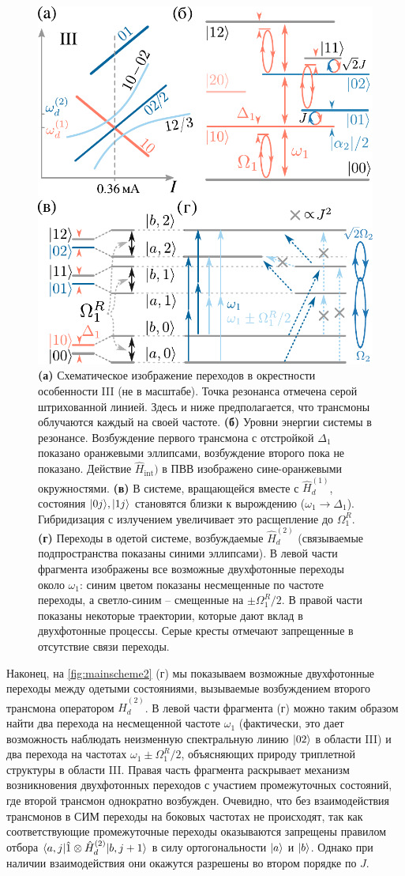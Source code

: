 \documentclass[14pt, a4paper]{extreport}
\DeclarePairedDelimiter\bra{\langle}{\rvert}
\DeclarePairedDelimiter\ket{\lvert}{\rangle}
\numberwithin{equation}{section}
\begin{document}
\begin{figure}
	\centering
	\includegraphics[width=0.6\linewidth]{Pictures/main_scheme_2}
	\caption{\textbf{(а)} Схематическое изображение переходов в окрестности особенности III (не в масштабе). Точка резонанса отмечена серой штрихованной линией. Здесь и ниже предполагается, что трансмоны облучаются каждый на своей частоте. \textbf{(б)} Уровни энергии системы в резонансе. Возбуждение первого трансмона с отстройкой $\Delta_1$ показано оранжевыми эллипсами, возбуждение второго пока не показано. Действие $\hat H_\text{int})$ в ПВВ изображено сине-оранжевыми окружностями. \textbf{(в)} В системе, вращающейся вместе с $\hat H_d^{(1)}$, состояния $\ket{0j},\ket{1j}$ становятся близки к вырождению ($\omega_1 \rightarrow \Delta_1$). Гибридизация с излучением увеличивает это расщепление до $\Omega_1^R$. \textbf{(г)} Переходы в одетой системе, возбуждаемые $\hat H_d^{(2)}$ (связываемые подпространства показаны синими эллипсами). В левой части фрагмента изображены все возможные двухфотонные переходы около $\omega_1$: синим цветом показаны несмещенные по частоте переходы, а светло-синим -- смещенные на $\pm \Omega_1^R/2$. В правой части показаны некоторые траектории, которые дают вклад в двухфотонные процессы. Серые кресты отмечают запрещенные в отсутствие связи переходы.}
	\label{fig:mainscheme2}
\end{figure}


Наконец, на \autoref{fig:mainscheme2} (г) мы показываем возможные двухфотонные переходы между одетыми состояниями, вызываемые возбуждением второго трансмона оператором $\hat H_d^{(2)}$. В левой части фрагмента (г) можно таким образом найти два перехода на несмещенной частоте $\omega_1$ (фактически, это дает возможность наблюдать неизменную спектральную линию $\ket{02}$ в области III) и два перехода на частотах $\omega_1 \pm \Omega_1^R/2$, объясняющих природу триплетной структуры в области III. Правая часть фрагмента раскрывает механизм возникновения двухфотонных переходов с участием промежуточных состояний, где второй трансмон однократно возбужден. Очевидно, что без взаимодействия трансмонов в СИМ переходы на боковых частотах не происходят, так как соответствующие промежуточные переходы оказываются запрещены правилом отбора $\bra{a,j}\hat 1\otimes \hat H_d^{(2)}\ket{b,j+1}$ в силу ортогональности $\ket{a}$ и $\ket{b}$. Однако при наличии взаимодействия они окажутся разрешены во втором порядке по $J$.
\end{document}
